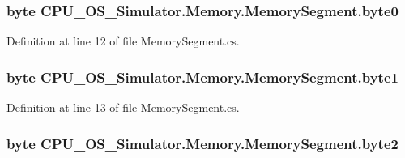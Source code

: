\subsubsection[{byte0}]{\setlength{\rightskip}{0pt plus 5cm}byte C\+P\+U\+\_\+\+O\+S\+\_\+\+Simulator.\+Memory.\+Memory\+Segment.\+byte0\hspace{0.3cm}{\ttfamily [private]}}\label{class_c_p_u___o_s___simulator_1_1_memory_1_1_memory_segment_a97b8721f717e2fd03673d9dd96882ef8}


Definition at line 12 of file Memory\+Segment.\+cs.

\hypertarget{class_c_p_u___o_s___simulator_1_1_memory_1_1_memory_segment_aa64e7a88f9cdf5dbb5b0c846cc570a77}{}
\subsubsection[{byte1}]{\setlength{\rightskip}{0pt plus 5cm}byte C\+P\+U\+\_\+\+O\+S\+\_\+\+Simulator.\+Memory.\+Memory\+Segment.\+byte1\hspace{0.3cm}{\ttfamily [private]}}\label{class_c_p_u___o_s___simulator_1_1_memory_1_1_memory_segment_aa64e7a88f9cdf5dbb5b0c846cc570a77}


Definition at line 13 of file Memory\+Segment.\+cs.

\hypertarget{class_c_p_u___o_s___simulator_1_1_memory_1_1_memory_segment_a4f6ad3b2d132bfc1c4bd16d8fcca8d56}{}
\subsubsection[{byte2}]{\setlength{\rightskip}{0pt plus 5cm}byte C\+P\+U\+\_\+\+O\+S\+\_\+\+Simulator.\+Memory.\+Memory\+Segment.\+byte2\hspace{0.3cm}{\ttfamily [private]}}\label{class_c_p_u___o_s___simulator_1_1_memory_1_1_memory_segment_a4f6ad3b2d132bfc1c4bd16d8fcca8d56}


